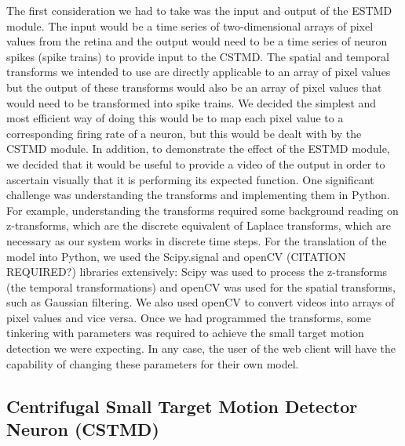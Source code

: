 \documentclass[a4paper,11pt]{article}
\begin{document}
The first consideration we had to take was the input and output of the ESTMD module. The input would be a time series of two-dimensional arrays of pixel values from the retina and the output would need to be a time series of neuron spikes (spike trains) to provide input to the CSTMD. The spatial and temporal transforms we intended to use are directly applicable to an array of pixel values but the output of these transforms would also be an array of pixel values that would need to be transformed into spike trains. We decided the simplest and most efficient way of doing this would be to map each pixel value to a corresponding firing rate of a neuron, but this would be dealt with by the CSTMD module. In addition, to demonstrate the effect of the ESTMD module, we decided that it would be useful to provide a video of the output in order to ascertain visually that it is performing its expected function.
\newline
\newline
One significant challenge was understanding the transforms and implementing them in Python. For example, understanding the transforms required some background reading on z-transforms, which are the discrete equivalent of Laplace transforms, which are necessary as our system works in discrete time steps. For the translation of the model into Python, we used the Scipy.signal and openCV (CITATION REQUIRED?) libraries extensively: Scipy was used to process the z-transforms (the temporal transformations) and openCV was used for the spatial transforms, such as Gaussian filtering. We also used openCV to convert videos into arrays of pixel values and vice versa.
\newline
\newline
Once we had programmed the transforms, some tinkering with parameters was required to achieve the small target motion detection we were expecting. In any case, the user of the web client will have the capability of changing these parameters for their own model.

\subsection{Centrifugal Small Target Motion Detector Neuron (CSTMD)}
\end{document}
